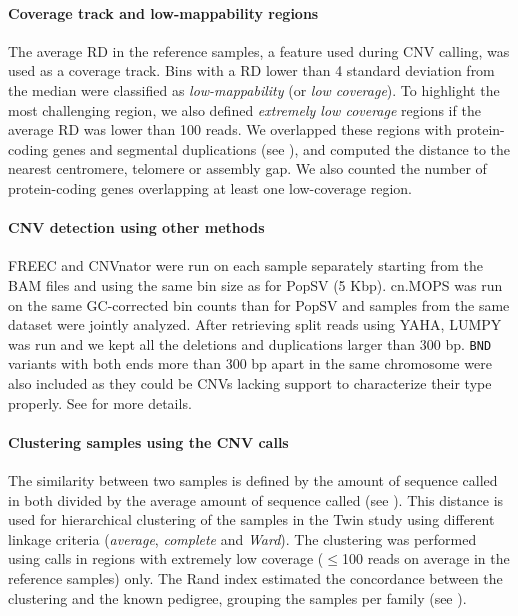 \paragraph{Coverage track and low-mappability regions}
The average RD in the reference samples, a feature used during CNV calling, was used as a coverage track.
Bins with a RD lower than 4 standard deviation from the median were classified as {\it low-mappability} (or {\it low coverage}).
To highlight the most challenging region, we also defined {\it extremely low coverage} regions if the average RD was lower than 100 reads.
We overlapped these regions with protein-coding genes and segmental duplications (see ), and computed the distance to the nearest centromere, telomere or assembly gap.
We also counted the number of protein-coding genes overlapping at least one low-coverage region.

\paragraph{CNV detection using other methods}
{\sf FREEC}\cite{Boeva2011} and {\sf CNVnator}\cite{Abyzov2011} were run on each sample separately starting from the BAM files and using the same bin size as for {\sf PopSV} (5 Kbp).
{\sf cn.MOPS}\cite{Klambauer2012} was run on the same GC-corrected bin counts than for {\sf PopSV} and samples from the same dataset were jointly analyzed.
After retrieving split reads using {\sf YAHA}\cite{Faust2012}, {\sf LUMPY}\cite{Layer2012} was run and we kept all the deletions and duplications larger than 300 bp.
\verb!BND! variants with both ends more than 300 bp apart in the same chromosome were also included as they could be CNVs lacking support to characterize their type properly.
See  for more details.

\paragraph{Clustering samples using the CNV calls}
The similarity between two samples is defined by the amount of sequence called in both divided by the average amount of sequence called (see ).
This distance is used for hierarchical clustering of the samples in the Twin study using different linkage criteria ({\it average}, {\it complete} and {\it Ward}).
The clustering was performed using calls in regions with extremely low coverage ($\le$100 reads on average in the reference samples) only.
The Rand index estimated the concordance between the clustering and the known pedigree, grouping the samples per family (see ).

